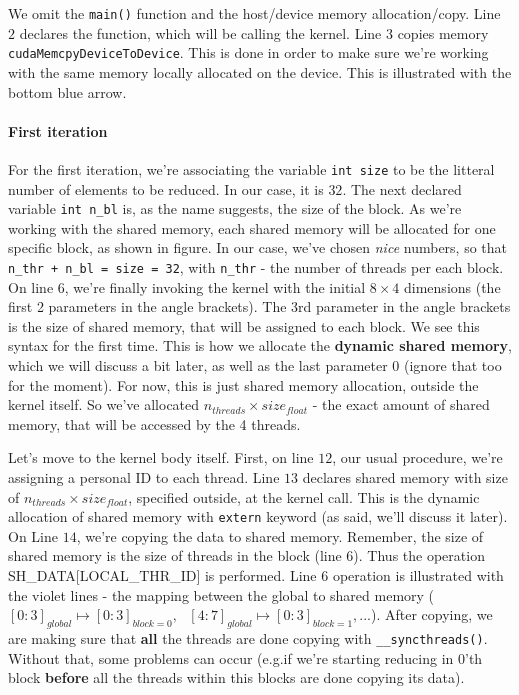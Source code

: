\documentclass[12pt]{article}
\begin{document}
\inputminted[frame=single, framesep=1mm, linenos=true]{cuda}{cucodes/shared_rreduced.cu}

We omit the \verb|main()| function and the host/device memory allocation/copy.
Line $2$ declares the function, which will be calling the kernel. Line $3$ copies memory 
\verb|cudaMemcpyDeviceToDevice|. This is done in order to make sure we're working with the same memory locally allocated on the device.
This is illustrated with the bottom blue arrow. 
\paragraph*{First iteration}
For the first iteration, we're associating the variable \verb|int size| to be the litteral 
number of elements to be reduced. In our case, it is $32$. The next declared variable \verb|int n_bl| is, 
as the name suggests, the size of the block. As we're working with the shared memory, each shared memory 
will be allocated for one specific block, as shown in figure. In our case, we've chosen \textit{nice} 
numbers, so that \verb|n_thr + n_bl = size = 32|, with \verb|n_thr| - the number of threads per each block.
On line $6$, we're finally invoking the kernel with the initial $8\times 4$ dimensions (the first 2 parameters in the angle brackets). 
The 3rd parameter in the angle brackets is the size of shared memory, that will be assigned to each block. 
We see this syntax for the first time. This is how we allocate the \textbf{dynamic shared memory}, which we will 
discuss a bit later, as well as the last parameter $0$ (ignore that too for the moment).
For now, this is just shared memory allocation, outside the kernel itself. So we've allocated 
$n_{threads}\times size_{float}$ - the exact amount of shared memory, that will be accessed by the 4 threads. 

Let's move to the kernel body itself. First, on line $12$, our usual procedure, we're assigning a personal 
ID to each thread. Line $13$ declares shared memory with size of $n_{threads}\times size_{float}$, specified outside, 
at the kernel call. This is the dynamic allocation of shared memory with \verb|extern| keyword 
(as said, we'll discuss it later). On Line $14$, we're copying the data to shared memory. Remember, 
the size of shared memory is the size of threads in the block (line $6$). Thus the operation 
SH\_DATA[LOCAL\_THR\_ID] is performed. Line $6$ operation is illustrated with the violet lines - the
mapping between the global to shared memory ($[0:3]_{global}\mapsto [0:3]_{block=0},\text{ } [4:7]_{global}\mapsto [0:3]_{block=1}, \text{...} $).
After copying, we are making sure that \textbf{all} the threads are done copying with \verb|__syncthreads()|. Without that, some problems can occur 
(e.g.if we're starting reducing in 0'th block \textbf{before} all the threads within this blocks are done copying its data).
\end{document}
